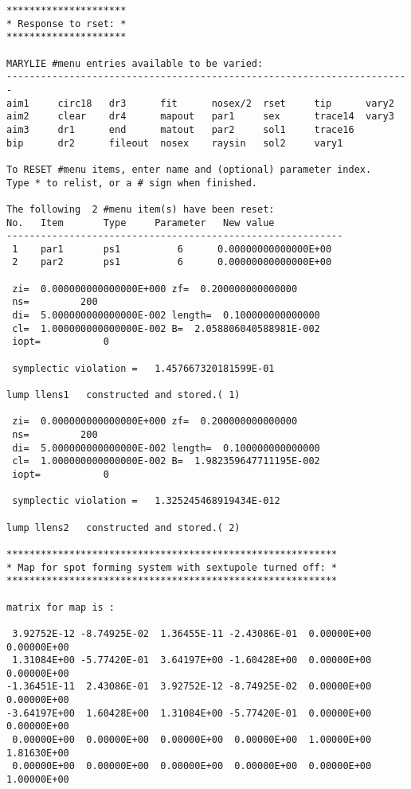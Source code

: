 \begin{footnotesize}
\begin{verbatim}
*********************
* Response to rset: *
*********************

MARYLIE #menu entries available to be varied:
-----------------------------------------------------------------------
aim1     circ18   dr3      fit      nosex/2  rset     tip      vary2
aim2     clear    dr4      mapout   par1     sex      trace14  vary3
aim3     dr1      end      matout   par2     sol1     trace16
bip      dr2      fileout  nosex    raysin   sol2     vary1

To RESET #menu items, enter name and (optional) parameter index.
Type * to relist, or a # sign when finished.

The following  2 #menu item(s) have been reset:
No.   Item       Type     Parameter   New value
-----------------------------------------------------------
 1    par1       ps1          6      0.00000000000000E+00
 2    par2       ps1          6      0.00000000000000E+00

 zi=  0.000000000000000E+000 zf=  0.200000000000000
 ns=         200
 di=  5.000000000000000E-002 length=  0.100000000000000
 cl=  1.000000000000000E-002 B=  2.058806040588981E-002
 iopt=           0

 symplectic violation =   1.457667320181599E-01

lump llens1   constructed and stored.( 1)

 zi=  0.000000000000000E+000 zf=  0.200000000000000
 ns=         200
 di=  5.000000000000000E-002 length=  0.100000000000000
 cl=  1.000000000000000E-002 B=  1.982359647711195E-002
 iopt=           0

 symplectic violation =   1.325245468919434E-012

lump llens2   constructed and stored.( 2)

**********************************************************
* Map for spot forming system with sextupole turned off: *
**********************************************************

matrix for map is :

 3.92752E-12 -8.74925E-02  1.36455E-11 -2.43086E-01  0.00000E+00  0.00000E+00
 1.31084E+00 -5.77420E-01  3.64197E+00 -1.60428E+00  0.00000E+00  0.00000E+00
-1.36451E-11  2.43086E-01  3.92752E-12 -8.74925E-02  0.00000E+00  0.00000E+00
-3.64197E+00  1.60428E+00  1.31084E+00 -5.77420E-01  0.00000E+00  0.00000E+00
 0.00000E+00  0.00000E+00  0.00000E+00  0.00000E+00  1.00000E+00  1.81630E+00
 0.00000E+00  0.00000E+00  0.00000E+00  0.00000E+00  0.00000E+00  1.00000E+00


\end{verbatim}
\end{footnotesize}
